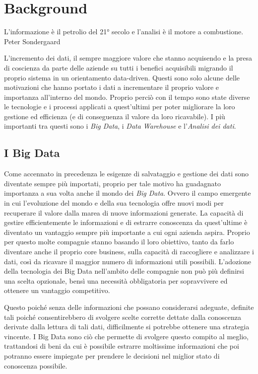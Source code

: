 \chapter{Background}
\label{ch:Background}

\begin{citazione}
 L'informazione è il petrolio del 21° secolo e l'analisi è il motore a combustione. Peter Sondergaard~\cite{peter_sondergaard_cyte}
\end{citazione}


L'incremento dei dati, il sempre maggiore valore che stanno acquisendo e la presa di coscienza da parte delle aziende su tutti i benefici acquisibili migrando il proprio sistema in un orientamento data-driven. Questi sono solo alcune delle motivazioni che hanno portato i dati a incrementare il proprio valore e importanza all'interno del mondo. Proprio perciò con il tempo sono state diverse le tecnologie e i processi applicati a quest'ultimi per poter migliorare la loro gestione ed efficienza (e di conseguenza il valore da loro ricavabile). I più importanti tra questi sono i \textit{Big Data}, i \textit{Data Warehouse} e l'\textit{Analisi dei dati}.

\section{I Big Data}

Come accennato in precedenza le esigenze di salvataggio e gestione dei dati sono diventate sempre più importati, proprio per tale motivo ha guadagnato importanza a sua volta anche il mondo dei \textit{Big Data}. Ovvero il campo emergente in cui l'evoluzione del mondo e della sua tecnologia offre nuovi modi per recuperare il valore dalla marea di nuove informazioni generate. La capacità di gestire efficientemente le informazioni e di estrarre conoscenza da quest'ultime è diventato un vantaggio sempre più importante a cui ogni azienda aspira. Proprio per questo molte compagnie stanno basando il loro obiettivo, tanto da farlo diventare anche il proprio core business, sulla capacità di raccogliere e analizzare i dati, così da ricavare il maggior numero di informazioni utili possibili. L'adozione della tecnologia dei Big Data nell'ambito delle compagnie non può più definirsi una scelta opzionale, bensì una necessità obbligatoria per sopravvivere ed ottenere un vantaggio competitivo.\cite{new_horizon_for_a_data_driven_economy}

Questo poiché senza delle informazioni che possano considerarsi adeguate, definite tali poiché consentirebbero di svolgere scelte corrette dettate dalla conoscenza derivate dalla lettura di tali dati, difficilmente si potrebbe ottenere una strategia vincente. I Big Data sono ciò che permette di svolgere questo compito al meglio, trattandosi di beni da cui è possibile estrarre moltissime informazioni che poi potranno essere impiegate per prendere le decisioni nel miglior stato di conoscenza possibile.\cite{iusitinere_big_data}

